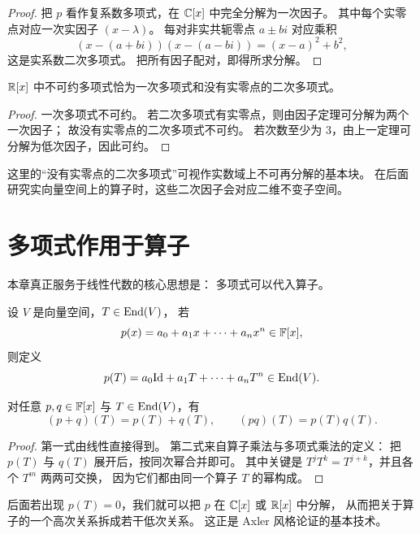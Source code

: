 \begin{proof}
把 $p$ 看作复系数多项式，在 $\mathbb{C}[x]$ 中完全分解为一次因子。
其中每个实零点对应一次实因子 $(x-\lambda)$。
每对非实共轭零点 $a\pm bi$ 对应乘积
\[
(x-(a+bi))(x-(a-bi))=(x-a)^2+b^2,
\]
这是实系数二次多项式。
把所有因子配对，即得所求分解。
\end{proof}

\begin{corollary}
$\mathbb{R}[x]$ 中不可约多项式恰为一次多项式和没有实零点的二次多项式。
\end{corollary}

\begin{proof}
一次多项式不可约。
若二次多项式有实零点，则由因子定理可分解为两个一次因子；
故没有实零点的二次多项式不可约。
若次数至少为 $3$，由上一定理可分解为低次因子，因此可约。
\end{proof}

\begin{remark}
这里的“没有实零点的二次多项式”可视作实数域上不可再分解的基本块。
在后面研究实向量空间上的算子时，这些二次因子会对应二维不变子空间。
\end{remark}

\section{多项式作用于算子}

本章真正服务于线性代数的核心思想是：
多项式可以代入算子。

\begin{definition}
设 $V$ 是向量空间，$T\in\mathrm{End}(V)$，
若
\[
p(x)=a_0+a_1x+\cdots+a_nx^n\in\mathbb{F}[x],
\]
则定义
\[
p(T)=a_0\mathrm{Id}+a_1T+\cdots+a_nT^n\in\mathrm{End}(V).
\]
\end{definition}

\begin{proposition}
对任意 $p,q\in\mathbb{F}[x]$ 与 $T\in\mathrm{End}(V)$，有
\[
(p+q)(T)=p(T)+q(T),\qquad (pq)(T)=p(T)q(T).
\]
\end{proposition}

\begin{proof}
第一式由线性直接得到。
第二式来自算子乘法与多项式乘法的定义：
把 $p(T)$ 与 $q(T)$ 展开后，按同次幂合并即可。
其中关键是 $T^jT^k=T^{j+k}$，并且各个 $T^m$ 两两可交换，
因为它们都由同一个算子 $T$ 的幂构成。
\end{proof}

\begin{remark}
后面若出现 $p(T)=0$，我们就可以把 $p$ 在 $\mathbb{C}[x]$ 或 $\mathbb{R}[x]$ 中分解，
从而把关于算子的一个高次关系拆成若干低次关系。
这正是 Axler 风格论证的基本技术。
\end{remark}

